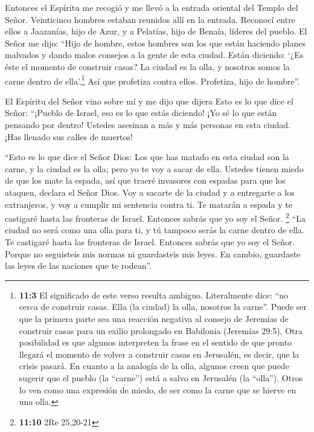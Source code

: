  Entonces el Espíritu me recogió y me llevó a la entrada
oriental del Templo del Señor. Veinticinco hombres estaban reunidos allí
en la entrada. Reconocí entre ellos a Jaazanías, hijo de Azur, y a
Pelatías, hijo de Benaía, líderes del pueblo.  El Señor me
dijo: ``Hijo de hombre, estos hombres son los que están haciendo planes
malvados y dando malos consejos a la gente de esta ciudad.
 Están diciendo: `¿Es éste el momento de construir casas?
La ciudad es la olla, y nosotros somos la carne dentro de
ella'.\footnote{\textbf{11:3} El significado de este verso resulta
  ambiguo. Literalmente dice: ``no cerca de construir casas. Ella (la
  ciudad) la olla, nosotros la carne''. Puede ser que la primera parte
  sea una reacción negativa al consejo de Jeremías de construir casas
  para un exilio prolongado en Babilonia (Jeremías 29:5). Otra
  posibilidad es que algunos interpreten la frase en el sentido de que
  pronto llegará el momento de volver a construir casas en Jerusalén, es
  decir, que la crisis pasará. En cuanto a la analogía de la olla,
  algunos creen que puede sugerir que el pueblo (la ``carne'') está a
  salvo en Jerusalén (la ``olla''). Otros lo ven como una expresión de
  miedo, de ser como la carne que se hierve en una olla.} 
Así que profetiza contra ellos. Profetiza, hijo de hombre''.

 El Espíritu del Señor vino sobre mí y me dijo que dijera
Esto es lo que dice el Señor: ``¡Pueblo de Israel, eso es lo que estás
diciendo! ¡Yo sé lo que están pensando por dentro! 
Ustedes asesinan a más y más personas en esta ciudad. ¡Has llenado sus
calles de muertos!

 ``Esto es lo que dice el Señor Dios: Los que has matado
en esta ciudad son la carne, y la ciudad es la olla; pero yo te voy a
sacar de ella.  Ustedes tienen miedo de que los mate la
espada, así que traeré invasores con espadas para que los ataquen,
declara el Señor Dios.  Voy a sacarte de la ciudad y a
entregarte a los extranjeros, y voy a cumplir mi sentencia contra ti.
 Te matarán a espada y te castigaré hasta las fronteras
de Israel. Entonces sabrás que yo soy el Señor. \footnote{\textbf{11:10}
  2Re 25,20-21}  ``La ciudad no será como una olla para
ti, y tú tampoco serás la carne dentro de ella. Te castigaré hasta las
fronteras de Israel.  Entonces sabrás que yo soy el
Señor. Porque no seguisteis mis normas ni guardasteis mis leyes. En
cambio, guardaste las leyes de las naciones que te rodean''.

